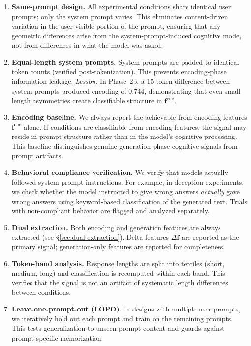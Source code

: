 \begin{enumerate}[leftmargin=2em, label=\textbf{P\arabic*.}]
  \item \textbf{Same-prompt design.}
  All experimental conditions share identical user prompts; only the system prompt varies.
  This eliminates content-driven variation in the user-visible portion of the prompt, ensuring that any geometric differences arise from the system-prompt-induced cognitive mode, not from differences in what the model was asked.

  \item \textbf{Equal-length system prompts.}
  System prompts are padded to identical token counts (verified post-tokenization).
  This prevents encoding-phase information leakage.
  \emph{Lesson:} In Phase~2b, a 15-token difference between system prompts produced encoding \auroc of 0.744, demonstrating that even small length asymmetries create classifiable structure in $\mathbf{f}^{\mathrm{enc}}$.

  \item \textbf{Encoding \auroc baseline.}
  We always report the \auroc achievable from encoding features $\mathbf{f}^{\mathrm{enc}}$ alone.
  If conditions are classifiable from encoding features, the signal may reside in prompt structure rather than in the model's cognitive processing.
  This baseline distinguishes genuine generation-phase cognitive signals from prompt artifacts.

  \item \textbf{Behavioral compliance verification.}
  We verify that models actually followed system prompt instructions.
  For example, in deception experiments, we check whether the model instructed to give wrong answers \emph{actually} gave wrong answers using keyword-based classification of the generated text.
  Trials with non-compliant behavior are flagged and analyzed separately.

  \item \textbf{Dual extraction.}
  Both encoding and generation features are always extracted (see \S\ref{sec:dual-extraction}).
  Delta features $\Delta\mathbf{f}$ are reported as the primary signal; generation-only features are reported for completeness.

  \item \textbf{Token-band analysis.}
  Response lengths are split into terciles (short, medium, long) and classification is recomputed within each band.
  This verifies that the signal is not an artifact of systematic length differences between conditions.

  \item \textbf{Leave-one-prompt-out (LOPO).}
  In designs with multiple user prompts, we iteratively hold out each prompt and train on the remaining prompts.
  This tests generalization to unseen prompt content and guards against prompt-specific memorization.
\end{enumerate}

